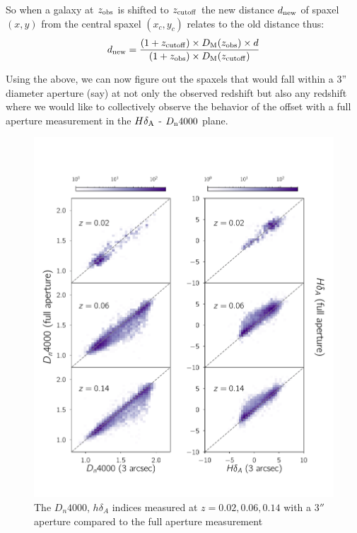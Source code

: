 So when a galaxy at $z_{\rm obs}$ is shifted to $z_{\rm cutoff}$ the new distance $d_{\rm new}$ of spaxel $(x,y)$ from the central spaxel $(x_{c},y_{c})$ relates to the old distance thus:
$$ d_{\rm new} = \frac{(1+z_{\rm cutoff})\times D_{\rm M}(z_{\rm obs}) \times d}{(1+z_{\rm obs}) \times  D_{\rm M}(z_{\rm cutoff})} $$

Using the above, we can now figure out the spaxels that would fall within a 3'' diameter aperture (say) at not only the observed redshift but also any redshift where we would like to collectively observe the behavior of the offset with a full aperture measurement in the $H\delta_{\rm A}$ - $D_{\rm n}4000$ plane.

\begin{figure}
\includegraphics[width=\textwidth]{figures/full_aperture_comparisons.pdf}
\caption[The $D_{n}4000$, $h\delta_{A}$ indices measured at $z = 0.02,0.06,0.14$ with a $3''$ aperture compared to the full aperture measurement]
{ The $D_{n}4000$, $h\delta_{A}$ indices measured at $z = 0.02,0.06,0.14$ with a $3''$ aperture compared to the full aperture measurement
\label{fig:redshift_comparison}}
\end{figure}


